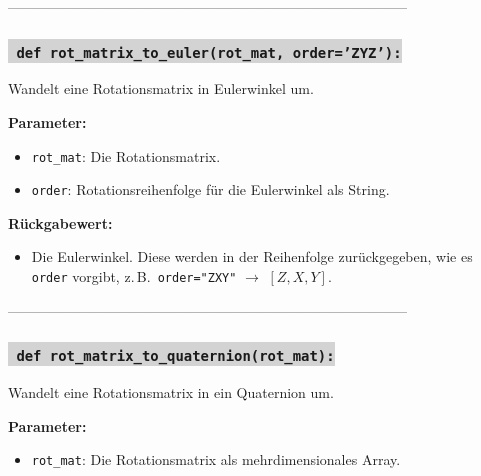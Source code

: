 --------------------------------------------------------------------------------------



\subsubsection*{\colorbox{lightgray}{\texttt{\textbf{\color{green} def} \color{blue} rot\_matrix\_to\_euler}\textbf{\texttt{(rot\_mat, order='ZYZ'):}}}}
Wandelt eine Rotationsmatrix in Eulerwinkel um.

\noindent \textbf{Parameter:} \vspace{-6ex} \\
\begin{itemize}
    \setlength{\itemindent}{1em}
    \item \texttt{rot\_mat}: Die Rotationsmatrix.
    \item \texttt{order}: Rotationsreihenfolge für die Eulerwinkel als String.
\end{itemize}

\noindent \textbf{Rückgabewert:} \vspace{-6ex} \\
\begin{itemize}
    \setlength{\itemindent}{1em}
    \item Die Eulerwinkel. Diese werden in der Reihenfolge zurückgegeben, wie es \texttt{order} vorgibt, z.\,B.\ \texttt{order="ZXY"} $\rightarrow$ $[Z, X, Y]$.
\end{itemize}

--------------------------------------------------------------------------------------



\subsubsection*{\colorbox{lightgray}{\texttt{\textbf{\color{green} def} \color{blue} rot\_matrix\_to\_quaternion}\textbf{\texttt{(rot\_mat):}}}}
Wandelt eine Rotationsmatrix in ein Quaternion um.

\noindent \textbf{Parameter:} \vspace{-6ex} \\
\begin{itemize}
    \setlength{\itemindent}{1em}
    \item \texttt{rot\_mat}: Die Rotationsmatrix als mehrdimensionales Array.
\end{itemize}

